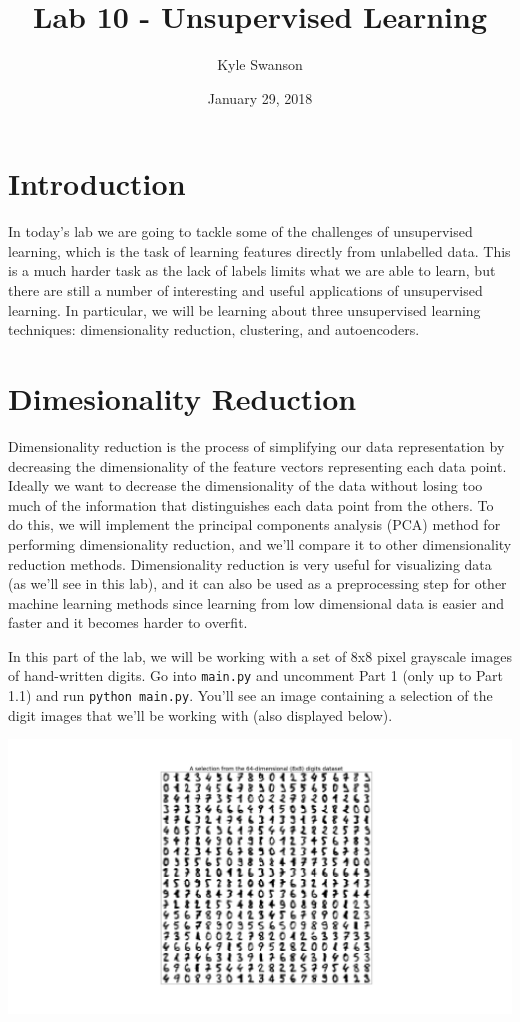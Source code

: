 \documentclass{article}
\title{Lab 10 - Unsupervised Learning}
\author{Kyle Swanson}
\date{January 29, 2018}
\begin{document}
\maketitle

\section{Introduction}

In today's lab we are going to tackle some of the challenges of unsupervised learning, which is the task of learning features directly from unlabelled data. This is a much harder task as the lack of labels limits what we are able to learn, but there are still a number of interesting and useful applications of unsupervised learning. In particular, we will be learning about three unsupervised learning techniques: dimensionality reduction, clustering, and autoencoders.

\section{Dimesionality Reduction}

Dimensionality reduction is the process of simplifying our data representation by decreasing the dimensionality of the feature vectors representing each data point. Ideally we want to decrease the dimensionality of the data without losing too much of the information that distinguishes each data point from the others. To do this, we will implement the principal components analysis (PCA) method for performing dimensionality reduction, and we'll compare it to other dimensionality reduction methods. Dimensionality reduction is very useful for visualizing data (as we'll see in this lab), and it can also be used as a preprocessing step for other machine learning methods since learning from low dimensional data is easier and faster and it becomes harder to overfit.

In this part of the lab, we will be working with a set of 8x8 pixel grayscale images of hand-written digits. Go into \texttt{main.py} and uncomment Part 1 (only up to Part 1.1) and run \texttt{python main.py}. You'll see an image containing a selection of the digit images that we'll be working with (also displayed below).

\noindent
\includegraphics[width=\textwidth]{digits.png}
\end{document}
